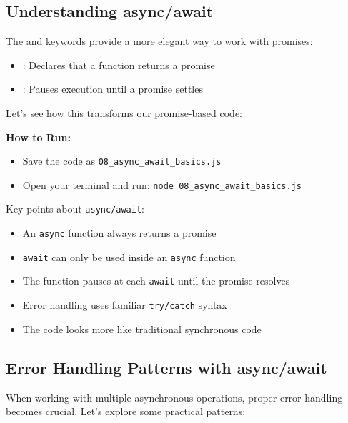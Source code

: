\subsection{Understanding async/await}

The  and  keywords provide a more elegant way to work with promises:

\begin{itemize}
    \item {}: Declares that a function returns a promise
    \item {}: Pauses execution until a promise settles
\end{itemize}

Let's see how this transforms our promise-based code:

\textbf{How to Run:}
\begin{itemize}
    \item Save the code as \verb|08_async_await_basics.js|
    \item Open your terminal and run: \verb|node 08_async_await_basics.js|
\end{itemize}

\begin{macterminal}
  
\end{macterminal}

Key points about \texttt{\textcolor{accentColor}{async/await}}:
\begin{itemize}
    \item An \texttt{\textcolor{accentColor}{async}} function always returns a promise
    \item \texttt{\textcolor{accentColor}{await}} can only be used inside an \texttt{\textcolor{accentColor}{async}} function
    \item The function pauses at each \texttt{\textcolor{accentColor}{await}} until the promise resolves
    \item Error handling uses familiar \texttt{\textcolor{accentColor}{try/catch}} syntax
    \item The code looks more like traditional synchronous code
\end{itemize}

\subsection{Error Handling Patterns with async/await}

When working with multiple asynchronous operations, proper error handling becomes crucial. Let's explore some practical patterns:


